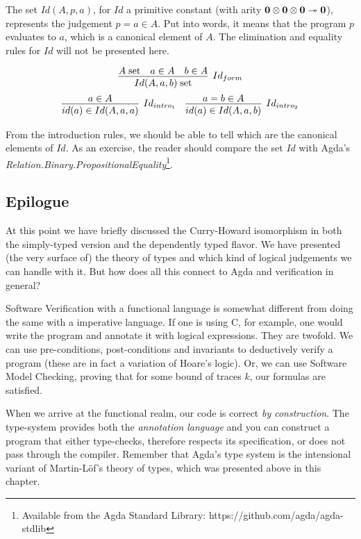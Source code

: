 The set $Id(A, p, a)$, for $Id$ a primitive constant (with arity $\textbf{0} \otimes \textbf{0} \otimes \textbf{0} \twoheadrightarrow \textbf{0}$),
represents the judgement $p = a \in A$. Put into words, it means that the program $p$ evaluates to $a$,
which is a canonical element of $A$. The elimination and equality rules for $Id$ will not be presented here.

\[
  \infer[Id_{form}]
        {\isset{Id(A, a, b)}}
        { \isset{A}
        & a \in A
        & b \in A
        }
\]
\[
\begin{array}{c c}
  \infer[Id_{intro_1}]
        {id(a) \in Id(A, a, a)}
        {a \in A}
&
  \infer[Id_{intro_2}]
        {id(a) \in Id(A, a, b)}
        {a = b \in A}
\end{array}
\]

From the introduction rules, we should be able to tell which are the canonical elements of $Id$.
As an exercise, the reader should compare the set $Id$ with Agda's \emph{Relation.Binary.PropositionalEquality}\footnote{%
Available from the Agda Standard Library: https://github.com/agda/agda-stdlib
}.

\subsection{Epilogue}

At this point we have briefly discussed the Curry-Howard isomorphism in both the simply-typed
version and the dependently typed flavor. We have presented (the very surface of) the theory
of types and which kind of logical judgements we can handle with it. But how does all this connect
to Agda and verification in general?

Software Verification with a functional language is somewhat different from doing the same with a imperative language. 
If one is using C, for example, one would write the program and annotate it with logical expressions.
They are twofold. We can use pre-conditions, post-conditions and invariants to deductively verify a program
(these are in fact a variation of Hoare's logic). Or, we can use Software Model Checking, proving
that for some bound of traces $k$, our formulas are satisfied.

When we arrive at the functional realm, our code is correct \emph{by construction}. The type-system
provides both the \emph{annotation language} and you can construct a program that either type-checks,
therefore respects its specification, or does not pass through the compiler. Remember that Agda's
type system is the intensional variant of Martin-L\"{o}f's theory of types, which was presented above
in this chapter.

